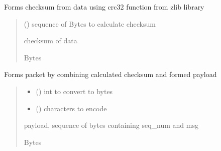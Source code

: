 \documentclass[letterpaper,10pt,oneside,english,openany]{sphinxmanual}
\begin{document}

\begin{fulllineitems}
\label{\detokenize{modules:sender_rdt.make_checksum}}
\pysigstartsignatures
\pysiglinewithargsret
{}
{}
{}
\pysigstopsignatures
\sphinxAtStartPar
Forms checksum from data using crc32 function from zlib library
\begin{quote}\begin{description}
\sphinxAtStartPar
{} () \textendash{} sequence of Bytes to calculate checksum

\sphinxAtStartPar
checksum of data

\sphinxAtStartPar
Bytes

\end{description}\end{quote}

\end{fulllineitems}


\begin{fulllineitems}
\label{\detokenize{modules:sender_rdt.make_packet}}
\pysigstartsignatures
\pysiglinewithargsret
{}
{\sphinxparamcomma {}\sphinxparamcomma {}}
{}
\pysigstopsignatures
\sphinxAtStartPar
Forms packet by combining calculated checksum and formed payload
\begin{quote}\begin{description}
\begin{itemize}
\item {} 
\sphinxAtStartPar
{} () \textendash{} int to convert to bytes

\item {} 
\sphinxAtStartPar
{} () \textendash{} characters to encode

\end{itemize}

\sphinxAtStartPar
payload, sequence of bytes containing seq\_num and msg

\sphinxAtStartPar
Bytes

\end{description}\end{quote}

\end{fulllineitems}
\end{document}
